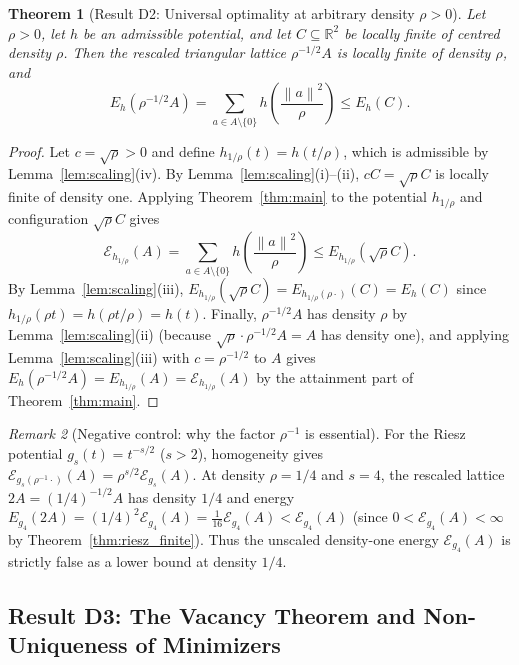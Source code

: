 \documentclass[11pt, a4paper]{article}
\newtheorem{theorem}{Theorem}[section]
\theoremstyle{definition}
\theoremstyle{remark}
\newtheorem{remark}[theorem]{Remark}
\newcommand{\R}{\mathbb{R}}
\newcommand{\Ecal}{\mathcal{E}}
\newcommand{\norm}[1]{\left\lVert #1 \right\rVert}
\begin{document}
\begin{theorem}[Result D2: Universal optimality at arbitrary density $\rho > 0$]
\label{thm:D2}
Let $\rho > 0$, let $h$ be an admissible potential, and let $C \subseteq \R^2$ be locally finite of centred density $\rho$. Then the rescaled triangular lattice $\rho^{-1/2} A$ is locally finite of density $\rho$, and
\[
E_h\left(\rho^{-1/2} A\right) = \sum_{a \in A \setminus \{0\}} h\left(\frac{\norm{a}^2}{\rho}\right) \le E_h(C).
\]
\end{theorem}

\begin{proof}
Let $c = \sqrt{\rho} > 0$ and define $h_{1/\rho}(t) = h(t/\rho)$, which is admissible by Lemma~\ref{lem:scaling}(iv). By Lemma~\ref{lem:scaling}(i)--(ii), $c C = \sqrt{\rho} C$ is locally finite of density one. Applying Theorem~\ref{thm:main} to the potential $h_{1/\rho}$ and configuration $\sqrt{\rho} C$ gives
\[
\Ecal_{h_{1/\rho}}(A) = \sum_{a \in A \setminus \{0\}} h\left(\frac{\norm{a}^2}{\rho}\right) \le E_{h_{1/\rho}}\left(\sqrt{\rho} C\right).
\]
By Lemma~\ref{lem:scaling}(iii), $E_{h_{1/\rho}}(\sqrt{\rho} C) = E_{h_{1/\rho}(\rho \cdot)}(C) = E_h(C)$ since $h_{1/\rho}(\rho t) = h(\rho t / \rho) = h(t)$. Finally, $\rho^{-1/2} A$ has density $\rho$ by Lemma~\ref{lem:scaling}(ii) (because $\sqrt{\rho} \cdot \rho^{-1/2} A = A$ has density one), and applying Lemma~\ref{lem:scaling}(iii) with $c = \rho^{-1/2}$ to $A$ gives $E_h(\rho^{-1/2} A) = E_{h_{1/\rho}}(A) = \Ecal_{h_{1/\rho}}(A)$ by the attainment part of Theorem~\ref{thm:main}.
\end{proof}

\begin{remark}[Negative control: why the factor $\rho^{-1}$ is essential]
\label{rem:unscaled_false}
For the Riesz potential $g_s(t) = t^{-s/2}$ ($s > 2$), homogeneity gives $\Ecal_{g_s(\rho^{-1} \cdot)}(A) = \rho^{s/2} \Ecal_{g_s}(A)$. At density $\rho = 1/4$ and $s = 4$, the rescaled lattice $2A = (1/4)^{-1/2} A$ has density $1/4$ and energy $E_{g_4}(2A) = (1/4)^2 \Ecal_{g_4}(A) = \frac{1}{16} \Ecal_{g_4}(A) < \Ecal_{g_4}(A)$ (since $0 < \Ecal_{g_4}(A) < \infty$ by Theorem~\ref{thm:riesz_finite}). Thus the unscaled density-one energy $\Ecal_{g_4}(A)$ is strictly false as a lower bound at density $1/4$.
\end{remark}

\subsection{Result D3: The Vacancy Theorem and Non-Uniqueness of Minimizers}
\end{document}
